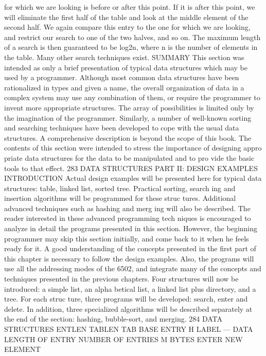\documentclass{book}
\begin{document}
{for which we are looking is before or after this point. If it
is after this point, we will eliminate the first half of the table and
look at the middle element of the second half. We again compare
this entry to the one for which we are looking, and restrict our search
to one of the two halves, and so on. The maximum length of a
search is then guaranteed to be log2n, where n is the number of
elements in the table.
Many other search techniques exist.
SUMMARY
This section was intended as only a brief presentation of typical
data structures which may be used by a programmer. Although
most common data structures have been rationalized in types and
given a name, the overall organization of data in a complex system
may use any combination of them, or require the programmer to
invent more appropriate structures. The array of possibilities is
limited only by the imagination of the programmer. Similarly, a
number of well-known sorting and searching techniques have been
developed to cope with the usual data structures. A comprehensive
description is beyond the scope of this book. The contents of this
section were intended to stress the importance of designing appro
priate data structures for the data to be manipulated and to pro
vide the basic tools to that effect.
283
DATA STRUCTURES
PART II: DESIGN EXAMPLES
INTRODUCTION
Actual design examples will be presented here for typical data
structures: table, linked list, sorted tree. Practical sorting, search
ing and insertion algorithms will be programmed for these struc
tures. Additional advanced techniques such as hashing and merg
ing will also be described.
The reader interested in these advanced programming tech
niques is encouraged to analyze in detail the programs presented
in this section. However, the beginning programmer may skip this
section initially, and come back to it when he feels ready for it.
A good understanding of the concepts presented in the first part
of this chapter is necessary to follow the design examples. Also,
the programs will use all the addressing modes of the 6502, and
integrate many of the concepts and techniques presented in the
previous chapters.
Four structures will now be introduced: a simple list, an alpha
betical list, a linked list plus directory, and a tree. For each struc
ture, three programs will be developed: search, enter and delete.
In addition, three specialized algorithms will be described separately
at the end of the section: hashing, bubble-sort, and merging.
284
DATA STRUCTURES
ENTLEN
TABLEN
TAB BASE
ENTRY
H LABEL —
DATA
LENGTH OF ENTRY
NUMBER OF ENTRIES
M BYTES
ENTER NEW ELEMENT
}
\end{document}
